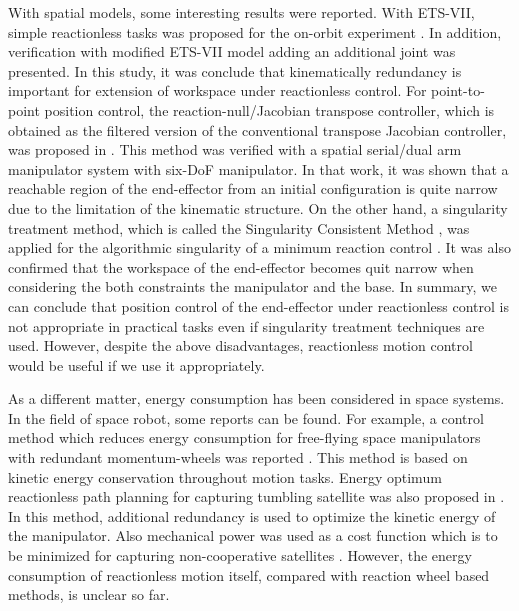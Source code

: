 \documentclass[preprint,12pt]{elsarticle}
\begin{document}
With spatial models,
some interesting results were reported.
With ETS-VII,
simple reactionless tasks was proposed for the on-orbit 
experiment \cite{Yoshida2001,Yoshida2000}.
In addition, verification with modified ETS-VII model adding an additional joint was presented.
In this study, it was conclude that kinematically redundancy is 
important for extension of workspace under reactionless control.
For point-to-point position control,
the reaction-null/Jacobian transpose controller,
which is obtained as the filtered version of the conventional transpose Jacobian controller,
was proposed in \cite{Pisculli2014}.
This method was verified with a spatial serial/dual arm manipulator system with six-DoF manipulator.
In that work,
it was shown that a reachable region of the end-effector from an initial
configuration is quite narrow due to the limitation of the kinematic structure.
On the other hand,
a singularity treatment method, which is called the Singularity Consistent Method \cite{Nenchev19993},
was applied for the algorithmic singularity of a minimum reaction control \cite{Nenchev19993}.
It was also confirmed that the workspace of the end-effector 
becomes quit narrow when considering the both constraints the manipulator and the base.
In summary, we can conclude that position control of the end-effector under reactionless control is not appropriate
in practical tasks even if singularity treatment techniques are used.
However, despite the above disadvantages,
reactionless motion control would be useful if we use it appropriately.

As a different matter,
energy consumption has been considered in space systems.
In the field of space robot,
some reports can be found.
For example, a control method which reduces energy consumption
for free-flying space manipulators with redundant momentum-wheels was reported \cite{Nakamura1993}.
This method is based on kinetic energy conservation throughout motion tasks.
Energy optimum reactionless path planning for capturing tumbling satellite was also proposed in \cite{Shah20132}.
In this method,
additional redundancy is used to optimize the kinetic energy of the manipulator.
Also mechanical power was used as a cost function
which is to be minimized for capturing non-cooperative satellites \cite{Lampariello2013}.
However,
the energy consumption of reactionless motion itself, compared with reaction wheel based methods, is unclear so far.
\end{document}
